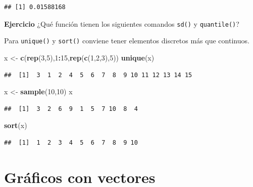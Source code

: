 \documentclass[
]{book}
\newenvironment{Shaded}{\begin{snugshade}}{\end{snugshade}}
\newcommand{\DecValTok}[1]{\textcolor[rgb]{0.00,0.00,0.81}{#1}}
\newcommand{\FunctionTok}[1]{\textcolor[rgb]{0.13,0.29,0.53}{\textbf{#1}}}
\newcommand{\NormalTok}[1]{#1}
\newcommand{\OtherTok}[1]{\textcolor[rgb]{0.56,0.35,0.01}{#1}}
\newcommand{\SpecialCharTok}[1]{\textcolor[rgb]{0.81,0.36,0.00}{\textbf{#1}}}
\begin{document}
\begin{verbatim}
## [1] 0.01588168
\end{verbatim}

\textbf{Ejercicio} ¿Qué función tienen los siguientes comandos \texttt{sd()} y \texttt{quantile()}?

Para \texttt{unique()} y \texttt{sort()} conviene tener elementos discretos más que continuos.

\begin{Shaded}
\begin{Highlighting}[]
\NormalTok{x }\OtherTok{\textless{}{-}} \FunctionTok{c}\NormalTok{(}\FunctionTok{rep}\NormalTok{(}\DecValTok{3}\NormalTok{,}\DecValTok{5}\NormalTok{),}\DecValTok{1}\SpecialCharTok{:}\DecValTok{15}\NormalTok{,}\FunctionTok{rep}\NormalTok{(}\FunctionTok{c}\NormalTok{(}\DecValTok{1}\NormalTok{,}\DecValTok{2}\NormalTok{,}\DecValTok{3}\NormalTok{),}\DecValTok{5}\NormalTok{))}
\FunctionTok{unique}\NormalTok{(x)}
\end{Highlighting}
\end{Shaded}

\begin{verbatim}
##  [1]  3  1  2  4  5  6  7  8  9 10 11 12 13 14 15
\end{verbatim}

\begin{Shaded}
\begin{Highlighting}[]
\NormalTok{x }\OtherTok{\textless{}{-}} \FunctionTok{sample}\NormalTok{(}\DecValTok{10}\NormalTok{,}\DecValTok{10}\NormalTok{)}
\NormalTok{x}
\end{Highlighting}
\end{Shaded}

\begin{verbatim}
##  [1]  3  2  6  9  1  5  7 10  8  4
\end{verbatim}

\begin{Shaded}
\begin{Highlighting}[]
\FunctionTok{sort}\NormalTok{(x)}
\end{Highlighting}
\end{Shaded}

\begin{verbatim}
##  [1]  1  2  3  4  5  6  7  8  9 10
\end{verbatim}

\hypertarget{gruxe1ficos-con-vectores}{%
\section{Gráficos con vectores}\label{gruxe1ficos-con-vectores}}
\end{document}
